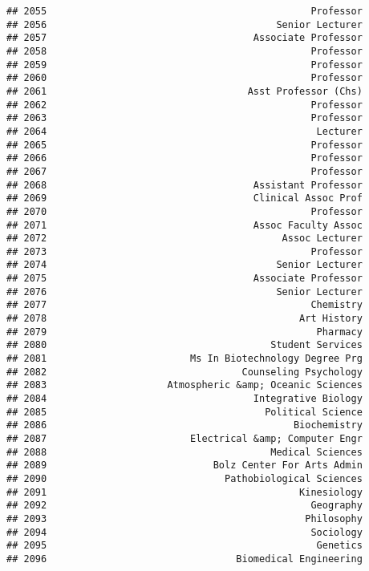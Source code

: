 \documentclass[
]{article}
\begin{document}
\begin{verbatim}
## 2055                                              Professor
## 2056                                        Senior Lecturer
## 2057                                    Associate Professor
## 2058                                              Professor
## 2059                                              Professor
## 2060                                              Professor
## 2061                                   Asst Professor (Chs)
## 2062                                              Professor
## 2063                                              Professor
## 2064                                               Lecturer
## 2065                                              Professor
## 2066                                              Professor
## 2067                                              Professor
## 2068                                    Assistant Professor
## 2069                                    Clinical Assoc Prof
## 2070                                              Professor
## 2071                                    Assoc Faculty Assoc
## 2072                                         Assoc Lecturer
## 2073                                              Professor
## 2074                                        Senior Lecturer
## 2075                                    Associate Professor
## 2076                                        Senior Lecturer
## 2077                                              Chemistry
## 2078                                            Art History
## 2079                                               Pharmacy
## 2080                                       Student Services
## 2081                         Ms In Biotechnology Degree Prg
## 2082                                  Counseling Psychology
## 2083                     Atmospheric &amp; Oceanic Sciences
## 2084                                    Integrative Biology
## 2085                                      Political Science
## 2086                                           Biochemistry
## 2087                         Electrical &amp; Computer Engr
## 2088                                       Medical Sciences
## 2089                             Bolz Center For Arts Admin
## 2090                               Pathobiological Sciences
## 2091                                            Kinesiology
## 2092                                              Geography
## 2093                                             Philosophy
## 2094                                              Sociology
## 2095                                               Genetics
## 2096                                 Biomedical Engineering

\end{verbatim}
\end{document}
